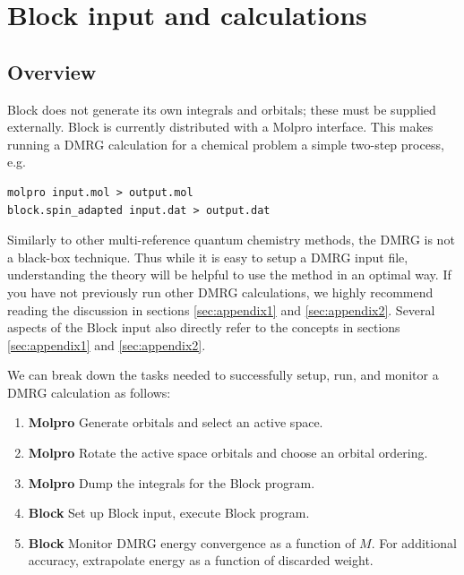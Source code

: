 \documentclass[letterpaper,12pt,aps, pra]{revtex4-1}
\begin{document}


\section{Block input and calculations}

\subsection{Overview}

Block does not generate its own integrals and orbitals; these must be supplied externally. Block
is currently distributed  with a Molpro interface. This makes running a DMRG calculation for a chemical problem a simple two-step process, e.g.
\begin{verbatim}
molpro input.mol > output.mol
block.spin_adapted input.dat > output.dat
\end{verbatim}

Similarly to other multi-reference quantum chemistry methods, the DMRG
is not a black-box technique. Thus while it is easy to setup a DMRG input file, understanding the theory will be helpful 
to use the method in an optimal way. If you have not
previously run other DMRG calculations, we highly recommend
reading the discussion  in sections \ref{sec:appendix1} and \ref{sec:appendix2}. 
Several aspects of the Block input also directly refer to the concepts in sections \ref{sec:appendix1} and \ref{sec:appendix2}. 

We can break down the tasks needed to successfully setup, run, and monitor a DMRG calculation as follows:
\begin{enumerate}
\item {\bf Molpro} Generate orbitals and select an active space. 
\item {\bf Molpro} Rotate the active space orbitals and choose an orbital ordering.
\item {\bf Molpro} Dump the integrals for the Block program.
\item {\bf Block} Set up Block input, execute Block program.
\item {\bf Block} Monitor DMRG energy convergence as a function of $M$. For additional accuracy, extrapolate energy as a function of discarded weight. 
\end{enumerate}
\end{document}
